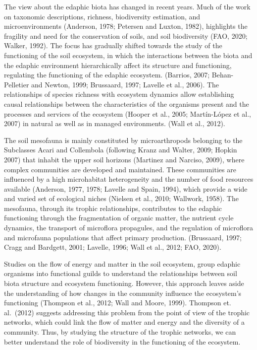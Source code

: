 \documentclass[11pt]{article}
\begin{document}
The view about the edaphic biota has changed in recent years. Much of
the work on taxonomic descriptions, richness, biodiversity estimation,
and microenvironments (Anderson, 1978; Petersen and Luxton, 1982),
highlights the fragility and need for the conservation of soils, and
soil biodiversity (FAO, 2020; Walker, 1992). The focus has gradually
shifted towards the study of the functioning of the soil ecosystem, in
which the interactions between the biota and the edaphic environment
hierarchically affect its structure and functioning, regulating the
functioning of the edaphic ecosystem. (Barrios, 2007; Behan-Pelletier
and Newton, 1999; Brussaard, 1997; Lavelle et al., 2006). The
relationships of species richness with ecosystem dynamics allow
establishing causal relationships between the characteristics of the
organisms present and the processes and services of the ecosystem
(Hooper et al., 2005; Martín-López et al., 2007) in natural as well as
in managed environments. (Wall et al., 2012).

The soil mesofauna is mainly constituted by microarthropods belonging to
the Subclasses Acari and Collembola (following Kranz and Walter, 2009;
Hopkin 2007) that inhabit the upper soil horizons (Martinez and Narciso,
2009), where complex communities are developed and maintained. These
communities are influenced by a high microhabitat heterogeneity and the
number of food resources available (Anderson, 1977, 1978; Lavelle and
Spain, 1994), which provide a wide and varied set of ecological niches
(Nielsen et al., 2010; Wallwork, 1958). The mesofauna, through its
trophic relationships, contributes to the edaphic functioning through
the fragmentation of organic matter, the nutrient cycle dynamics, the
transport of microflora propagules, and the regulation of microflora and
microfauna populations that affect primary production. (Brussaard, 1997;
Cragg and Bardgett, 2001; Lavelle, 1996; Wall et al., 2012; FAO, 2020).

Studies on the flow of energy and matter in the soil ecosystem, group
edaphic organisms into functional guilds to understand the relationships
between soil biota structure and ecosystem functioning. However, this
approach leaves aside the understanding of how changes in the community
influence the ecosystem's functioning (Thompson et al., 2012; Wall and
Moore, 1999). Thompson et. al.~(2012) suggests addressing this problem
from the point of view of the trophic networks, which could link the
flow of matter and energy and the diversity of a community. Thus, by
studying the structure of the trophic networks, we can better understand
the role of biodiversity in the functioning of the ecosystem.
\end{document}
